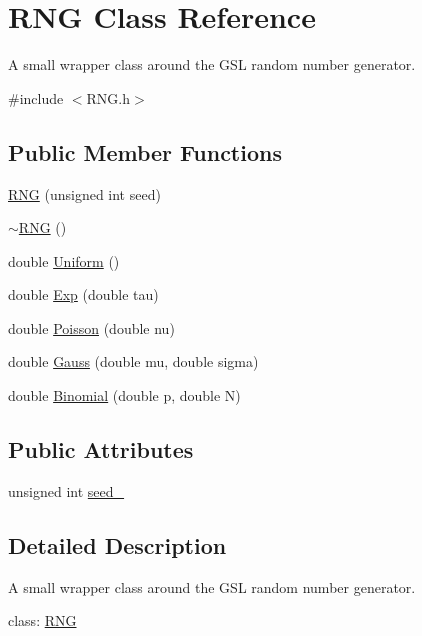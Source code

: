 \hypertarget{classRNG}{\section{R\-N\-G Class Reference}
\label{classRNG}
}


A small wrapper class around the G\-S\-L random number generator.  




{\ttfamily \#include $<$R\-N\-G.\-h$>$}

\subsection*{Public Member Functions}
\begin{DoxyCompactItemize}
\item 
\hyperlink{classRNG_ad1a0404ddd79895cfc05432f06c9c385}{R\-N\-G} (unsigned int seed)
\item 
\hyperlink{classRNG_abe0c541fcfa0b12ef7446eccb166d510}{$\sim$\-R\-N\-G} ()
\item 
double \hyperlink{classRNG_a6f369de914cf763da0a0bc8c17affb12}{Uniform} ()
\item 
double \hyperlink{classRNG_aa8a14d0a3367ada957ab898ff6974957}{Exp} (double tau)
\item 
double \hyperlink{classRNG_a959d86ea22fc5bb2f5ff6ded9881137a}{Poisson} (double nu)
\item 
double \hyperlink{classRNG_afe51d6c541a71af3a80c2ecf86d81523}{Gauss} (double mu, double sigma)
\item 
double \hyperlink{classRNG_a37fc5d27bda97b756e92565183f48d66}{Binomial} (double p, double N)
\end{DoxyCompactItemize}
\subsection*{Public Attributes}
\begin{DoxyCompactItemize}
\item 
unsigned int \hyperlink{classRNG_aa644a44fe1386322507d92e23066d063}{seed\-\_\-}
\end{DoxyCompactItemize}


\subsection{Detailed Description}
A small wrapper class around the G\-S\-L random number generator. 

class\-: \hyperlink{classRNG}{R\-N\-G} 

